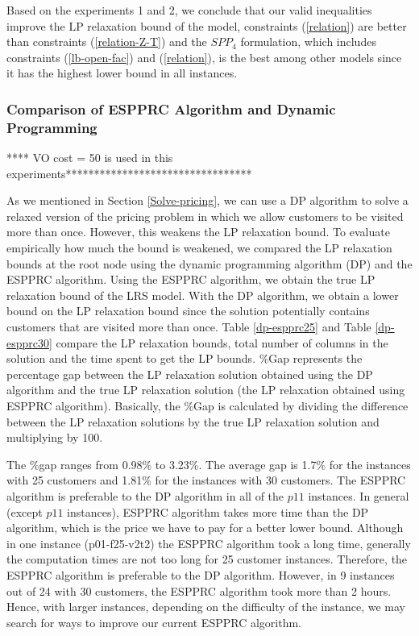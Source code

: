 Based on the experiments 1 and 2, we conclude that our valid inequalities improve the LP relaxation bound of the model, 
constraints (\ref{relation}) are better than  constraints (\ref{relation-Z-T}) and the $SPP_4$ formulation, which includes 
constraints (\ref{lb-open-fac}) and (\ref{relation}), is the best among other models since it has the highest 
lower bound in all instances. 


\qquad


\subsubsection{Comparison of ESPPRC Algorithm and Dynamic Programming}
\label{comp-espprc-dp}
**** VO cost = 50 is used in this experiments********************************* 

As we mentioned in Section \ref{Solve-pricing}, we can use a DP algorithm to  solve
a relaxed version of the pricing problem in which we allow customers to be visited
more than once. However, this weakens the LP relaxation bound. To evaluate empirically how much the bound
is weakened, we compared the LP relaxation bounds at the root node using the dynamic 
programming algorithm (DP) and the ESPPRC algorithm. Using the ESPPRC algorithm, we obtain
the true LP relaxation bound of the LRS model. With the DP algorithm, we obtain a lower 
bound on the LP relaxation bound since the solution potentially contains customers 
that are visited more than once. Table \ref{dp-espprc25} and   Table \ref{dp-espprc30} 
compare the LP relaxation bounds, total number of columns in the solution and the time 
spent to get the LP bounds. \%Gap represents the percentage gap between the LP relaxation 
solution obtained using the DP algorithm and the true LP relaxation solution (the LP relaxation obtained 
using ESPPRC algorithm). Basically, the \%Gap is calculated by dividing the difference between
the LP relaxation solutions by the true LP relaxation solution and multiplying by 100.  

The \%gap ranges from 0.98\% to 3.23\%. The average gap is 1.7\%  for the 
instances with 25 customers and 1.81\% for the instances with 30 customers. The 
ESPPRC algorithm is preferable to the DP algorithm in all of the $p11$ instances. 
In general (except $p11$ instances), ESPPRC algorithm takes more time than the DP algorithm,
which is the price we have to pay for a better lower bound. Although in one instance 
(p01-f25-v2t2) the ESPPRC algorithm took a long time, generally the computation times are 
not too long for 25 customer instances. Therefore, the ESPPRC algorithm is preferable
to the DP algorithm. However, in 9 instances out of 24 with 30 customers, the ESPPRC 
algorithm took more than 2 hours. Hence, with larger instances, depending on the difficulty of the 
instance,  we may search for ways to improve our current ESPPRC algorithm.
  
